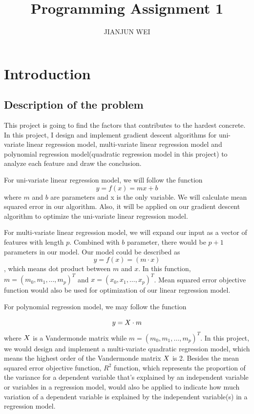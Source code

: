 \documentclass{article}
\title{Programming Assignment 1}
\author{JIANJUN WEI}
\begin{document}
\maketitle


\section{Introduction}

\subsection{Description of the problem}

This project is going to find the factors that contributes to the hardest concrete. In this project, I design and implement gradient descent algorithms for uni-variate linear regression model, multi-variate linear regression model and polynomial regression model(quadratic regression model in this project) to analyze each feature and draw the conclusion.

For uni-variate linear regression model, we will follow the function
\begin{equation*}
  y=f(x)=mx+b
\end{equation*}
 where $m$ and $b$ are parameters and x is the only variable. We will calculate mean squared error in our algorithm. Also, it will be applied on our gradient descent algorithm to optimize the uni-variate linear regression model.

For multi-variate linear regression model, we will expand our input as a vector of features with length $p$. Combined with $b$ parameter, there would be $p+1$ parameters in our model. Our model could be described as 
\begin{equation*}
  y=f(x) =(m \cdot x)
\end{equation*}
, which means dot product between $m$ and $x$. In this function, $m = (m_0, m_1, \dots, m_p)^T$ and $x = (x_0, x_1, \dots, x_p)^T$. Mean squared error objective function would also be used for optimization of our linear regression model.

For polynomial regression model, we may follow the function

\begin{equation*}
   y = \MakeUppercase{X} \cdot m
\end{equation*}
where $\MakeUppercase{X}$ is a Vandermonde matrix while $m = (m_0, m_1, \dots, m_p)^T$. In this project, we would design and implement a multi-variate quadratic regression model, which means the highest order of the Vandermonde matrix $\MakeUppercase{X}$ is 2. Besides the mean squared error objective function, $R^2$ function, which represents the proportion of the variance for a dependent variable that's explained by an independent variable or variables in a regression model, would also be applied to indicate how much variation of a dependent variable is explained by the independent variable(s) in a regression model.
\end{document}
